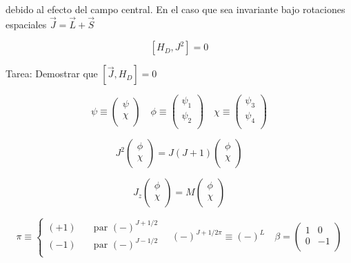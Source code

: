 \documentclass{report}
\begin{document}
debido al efecto del campo central. En el caso que sea invariante bajo rotaciones espaciales $\overrightarrow{J} = \overrightarrow{L} + \overrightarrow{S}$

\[[H_D , J^2] = 0\]

Tarea: Demostrar que $[\overrightarrow{J},H_D ] = 0$

\[\psi \equiv \left ( \begin{array}{cc}
 \psi   \\
 \chi   \\
 \end{array} \right) \quad \phi \equiv \left ( \begin{array}{cc}
 \psi_1   \\
 \psi _2   \\
 \end{array} \right) \quad \chi \equiv \left ( \begin{array}{cc}
 \psi_3   \\
 \psi_4   \\
 \end{array} \right) \]

\[J^2 \left ( \begin{array}{cc}
 \phi   \\
 \chi   \\
 \end{array} \right) = J(J+1) \left ( \begin{array}{cc}
 \phi   \\
 \chi   \\
 \end{array} \right)\]

\[J_z \left ( \begin{array}{cc}
 \phi   \\
 \chi   \\
 \end{array} \right) = M \left ( \begin{array}{cc}
 \phi   \\
 \chi   \\
 \end{array} \right)\]

\[\pi \equiv 
  \begin{cases}
    (+1)       & \quad \text{par } (-)^{J+1/2} \\
    (-1)  & \quad \text{par } (-)^{J-1/2} \\
  \end{cases} \quad (-)^{J+1/2 \pi} \equiv (-)^L \quad \beta = \left ( \begin{array}{cc}
 1 & 0   \\
 0 & -1   \\
 \end{array} \right) 
\]
\end{document}
